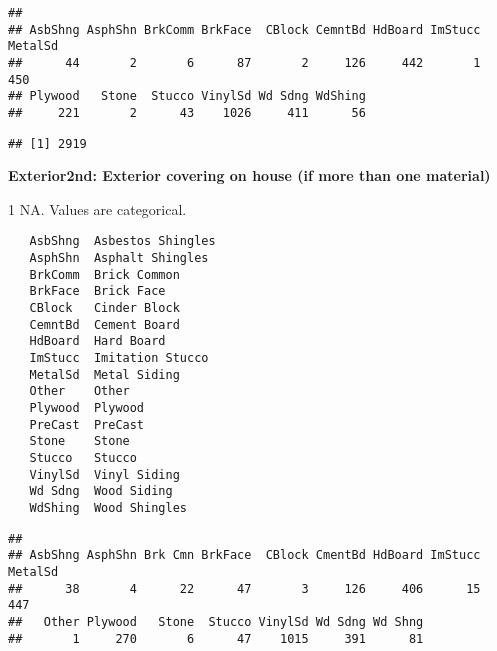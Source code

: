 \documentclass[]{article}
\newenvironment{Shaded}{\begin{snugshade}}{\end{snugshade}}
\newcommand{\CommentTok}[1]{\textcolor[rgb]{0.56,0.35,0.01}{\textit{#1}}}
\newcommand{\DecValTok}[1]{\textcolor[rgb]{0.00,0.00,0.81}{#1}}
\newcommand{\KeywordTok}[1]{\textcolor[rgb]{0.13,0.29,0.53}{\textbf{#1}}}
\newcommand{\NormalTok}[1]{#1}
\newcommand{\OperatorTok}[1]{\textcolor[rgb]{0.81,0.36,0.00}{\textbf{#1}}}
\newcommand{\StringTok}[1]{\textcolor[rgb]{0.31,0.60,0.02}{#1}}
\begin{document}
\begin{verbatim}
## 
## AsbShng AsphShn BrkComm BrkFace  CBlock CemntBd HdBoard ImStucc MetalSd 
##      44       2       6      87       2     126     442       1     450 
## Plywood   Stone  Stucco VinylSd Wd Sdng WdShing 
##     221       2      43    1026     411      56
\end{verbatim}

\begin{Shaded}
\end{Shaded}

\begin{verbatim}
## [1] 2919
\end{verbatim}

\textbf{Exterior2nd: Exterior covering on house (if more than one
material)}

1 NA. Values are categorical.

\begin{verbatim}
   AsbShng  Asbestos Shingles
   AsphShn  Asphalt Shingles
   BrkComm  Brick Common
   BrkFace  Brick Face
   CBlock   Cinder Block
   CemntBd  Cement Board
   HdBoard  Hard Board
   ImStucc  Imitation Stucco
   MetalSd  Metal Siding
   Other    Other
   Plywood  Plywood
   PreCast  PreCast
   Stone    Stone
   Stucco   Stucco
   VinylSd  Vinyl Siding
   Wd Sdng  Wood Siding
   WdShing  Wood Shingles
\end{verbatim}

\begin{Shaded}
\end{Shaded}

\begin{verbatim}
## 
## AsbShng AsphShn Brk Cmn BrkFace  CBlock CmentBd HdBoard ImStucc MetalSd 
##      38       4      22      47       3     126     406      15     447 
##   Other Plywood   Stone  Stucco VinylSd Wd Sdng Wd Shng 
##       1     270       6      47    1015     391      81
\end{verbatim}
\end{document}
